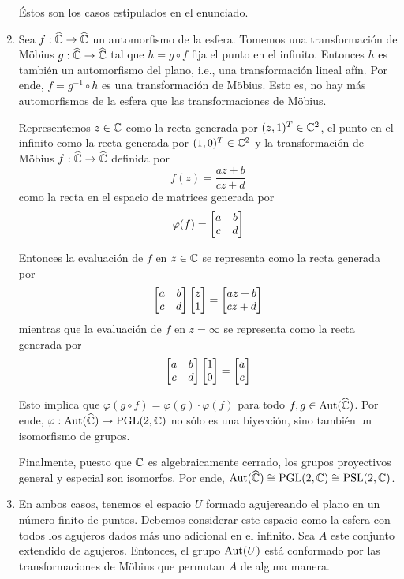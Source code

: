 \begin{solution}
\begin{enumerate}[label=\alph*)]
    Éstos son los casos estipulados en el enunciado.
    
    \item Sea $f : \widehat {\mathbb C} \to \widehat {\mathbb C}$ un automorfismo de la esfera. Tomemos una transformación de Möbius $g : \widehat {\mathbb C} \to \widehat {\mathbb C}$ tal que $h = g \circ f$ fija el punto en el infinito. Entonces $h$ es también un automorfismo del plano, i.e., una transformación lineal afín. Por ende, $f = g^{-1} \circ h$ es una transformación de Möbius. Esto es, no hay más automorfismos de la esfera que las transformaciones de Möbius.
    
    Representemos $z \in \mathbb C$ como la recta generada por $(z, 1)^T \in \mathbb C^2$, el punto en el infinito como la recta generada por $(1, 0)^T \in \mathbb C^2$ y la transformación de Möbius $f : \widehat {\mathbb C} \to \widehat {\mathbb C}$ definida por
    $$f(z) = \frac {az + b} {cz + d}$$
    como la recta en el espacio de matrices generada por
    $$\varphi(f) = \begin{bmatrix} a & b \\ c & d \end{bmatrix}$$
    
    Entonces la evaluación de $f$ en $z \in \mathbb C$ se representa como la recta generada por
    $$\begin{bmatrix} a & b \\ c & d \end{bmatrix} \begin{bmatrix} z \\ 1 \end{bmatrix} = \begin{bmatrix} az + b \\ cz + d \end{bmatrix}$$
    mientras que la evaluación de $f$ en $z = \infty$ se representa como la recta generada por
    $$\begin{bmatrix} a & b \\ c & d \end{bmatrix} \begin{bmatrix} 1 \\ 0 \end{bmatrix} = \begin{bmatrix} a \\ c \end{bmatrix}$$
    
    Esto implica que $\varphi(g \circ f) = \varphi(g) \cdot \varphi(f)$ para todo $f, g \in \operatorname{Aut}(\widehat {\mathbb C})$. Por ende, $\varphi : \operatorname{Aut}(\widehat {\mathbb C}) \to \operatorname{PGL}(2, \mathbb C)$ no sólo es una biyección, sino también un isomorfismo de grupos.
    
    Finalmente, puesto que $\mathbb C$ es algebraicamente cerrado, los grupos proyectivos general y especial son isomorfos. Por ende, $\operatorname{Aut}(\widehat {\mathbb C}) \cong \operatorname{PGL}(2, \mathbb C) \cong \operatorname{PSL}(2, \mathbb C)$.
    
    \item En ambos casos, tenemos el espacio $U$ formado agujereando el plano en un número finito de puntos. Debemos considerar este espacio como la esfera con todos los agujeros dados más uno adicional en el infinito. Sea $A$ este conjunto extendido de agujeros. Entonces, el grupo $\operatorname{Aut}(U)$ está conformado por las transformaciones de Möbius que permutan $A$ de alguna manera.
    

\end{enumerate}
\end{solution}
